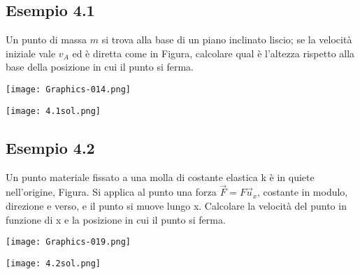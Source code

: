 \documentclass[../../main.tex]{subfiles}
\begin{document}
\subsection{Esempio 4.1}
Un punto di massa $m$ si trova alla base di un piano inclinato liscio; se la velocità iniziale vale $v_A$ ed è diretta come in Figura, calcolare qual è l’altezza rispetto alla base della posizione in cui il punto si ferma.\\
\begin{minipage}{0.3\textwidth}
    \centering
    \texttt{[image: Graphics-014.png]}
\end{minipage}
\begin{minipage}{0.7\textwidth}
    \centering
    \texttt{[image: 4.1sol.png]}
\end{minipage}
\subsection{Esempio 4.2}
Un punto materiale fissato a una molla di costante elastica k è in quiete nell’origine, Figura. Si applica al punto una forza $\vec F = F \vec u_x$, costante in modulo, direzione e verso, e il punto si muove lungo x. Calcolare la velocità del punto in funzione di x e la posizione in cui il punto si ferma.
\begin{minipage}
    {0.3\textwidth}
    \centering
    \texttt{[image: Graphics-019.png]}
\end{minipage}
\begin{minipage}{0.7\textwidth}
    \centering
    \texttt{[image: 4.2sol.png]}
\end{minipage}
\end{document}
